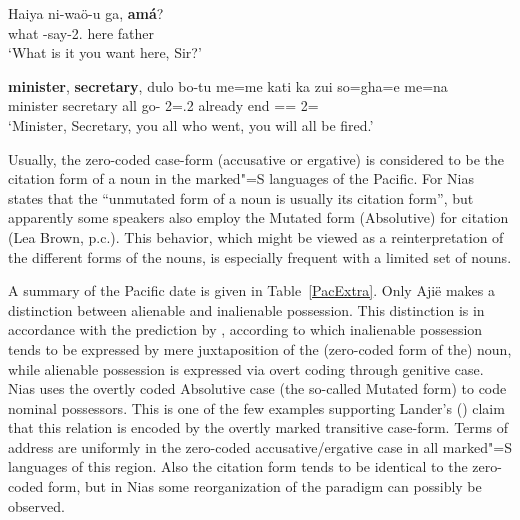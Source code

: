 
\begin{exe}
\ex\label{NiaVoc} 
\gll Haiya ni-wa\"o-u ga,  \textbf{am\'a}?\\
what \pass{}-say-2\sg{}.\poss{} here father\\
\glt `What is it you want here, Sir?'
\end{exe}

\begin{exe}\ex\label{SavVoc}
\raggedright
\gll \textbf{minister}, \textbf{secretary}, dulo bo-tu me=me kati ka zui so=gha=e me=na\\
minister secretary all go-\relativ{} 2\pl{}=\emphat{}.2\pl{} \cert{} already end \att{}=\pl{}=\emphat{} 2\pl{}=\nom{}\\
\glt `Minister, Secretary, you all who went, you will all be fired.'
\end{exe}


Usually, the zero-coded case-form (accusative or ergative) is considered to be the citation form of a noun in the marked"=S languages of the Pacific. 
For Nias \citet[69]{Brown:2001} states that the ``unmutated form of a noun is usually its citation form'', but apparently some speakers also employ the Mutated form (Absolutive) for citation (Lea Brown, p.c.). 
This behavior, which might be viewed as a reinterpretation of the different forms of the nouns, is especially frequent with a limited set of nouns.

A summary of the Pacific date is given in Table~\ref{PacExtra}. 
Only Aji\"e makes a distinction between alienable and inalienable possession. 
This distinction is in accordance with the prediction by \citet[4--5]{Chappell:1996}, according to which inalienable possession tends to be expressed by mere juxtaposition of the (zero-coded form of the) noun, while alienable possession is expressed via overt coding through genitive case.
Nias uses the overtly coded Absolutive case (the so-called Mutated form) to code nominal possessors. 
This is one of the few examples supporting Lander's (\citeyear[590]{Lander:2009}) claim that this relation is encoded by the overtly marked transitive case-form. 
Terms of address are uniformly in the zero-coded accusative/ergative case in all marked"=S languages of this region.
Also the citation form tends to be identical to the zero-coded form, but in Nias some reorganization of the paradigm can possibly be observed.

